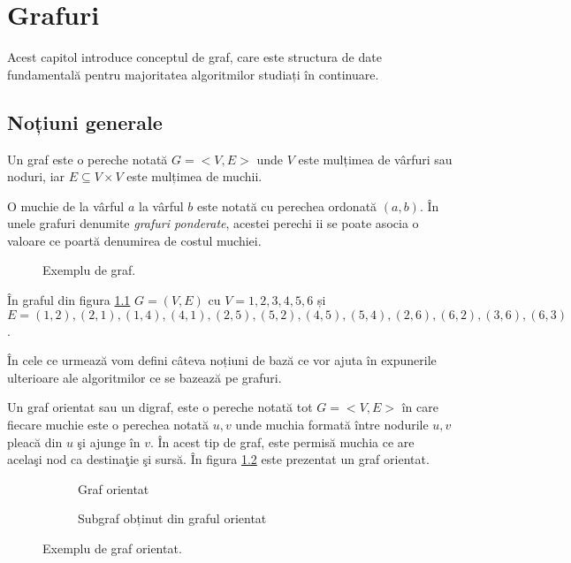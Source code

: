 \chapter{Grafuri}
\label{grafuri}%

Acest capitol introduce conceptul de graf, care este structura de date fundamentală pentru majoritatea algoritmilor studiați în continuare.

\section{Noțiuni generale}



Un graf este o pereche notată $G=<V,E>$ unde $V$ este mulțimea de vârfuri sau noduri, iar $E\subseteq V \times V$ este mulțimea de muchii.

O muchie de la vârful $a$ la vârful $b$ este notată cu perechea ordonată $(a,b)$. În unele grafuri denumite \textit{grafuri ponderate}, acestei perechi ii se poate asocia o valoare ce poartă denumirea de costul muchiei.

\begin{figure}[H] 
	\centering	
	{
	}
	\caption{Exemplu de graf.} 
	\label{fig:simplegraph}
\end{figure}

În graful din figura \ref{fig:simplegraph} $G=(V,E)$ cu $V={1,2,3,4,5,6}$ și $E=(1,2),(2,1),(1,4),(4,1),(2,5),(5,2),(4,5),(5,4),(2,6),(6,2),(3,6),(6,3)$.

În cele ce urmează vom defini câteva noțiuni de bază ce vor ajuta în expunerile ulterioare ale algoritmilor ce se bazează pe grafuri.

Un graf orientat sau un digraf, este o pereche notată tot $G=<V,E>$  în care fiecare muchie este o perechea notată ${u,v}$ unde muchia formată între nodurile $u,v$ pleacă din $u$ şi ajunge în $v$. În acest tip de graf, este permisă muchia ce are acelaşi nod ca destinaţie şi sursă. În figura \ref{fig:ograf} este prezentat un graf orientat.

\begin{figure}[H] 
	 \begin{subfigure}{0.5\textwidth}
		\caption{Graf orientat}
		\label{fig:ograf}
	\end{subfigure}
	\begin{subfigure}{0.5\textwidth}
		\caption{Subgraf obținut din graful orientat}
		\label{fig:subgraf}
	\end{subfigure}
	\caption{Exemplu de graf orientat.} 
	\label{fig:orientedgraph}
\end{figure}

